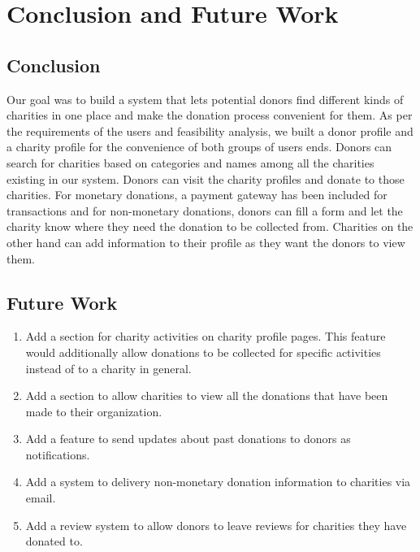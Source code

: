 \documentclass{scrreprt}
\begin{document}
\chapter{Conclusion and Future Work}

    \section{Conclusion}
    
        Our goal was to build a system that lets potential donors find different kinds of charities in one place and make the donation process convenient for them. As per the requirements of the users
        and feasibility analysis, we built a donor profile and a charity profile for the convenience of both groups of users ends. Donors can search for charities based on categories and names among all the charities existing in our system. Donors can visit the charity  profiles and donate to those charities. For monetary donations, a payment gateway has been included for transactions and for non-monetary donations, donors can fill a form and let the charity know where they need the donation to be collected from. Charities on the other hand can add information to their profile as they want the donors to view them.

    \section{Future Work}
        \begin{enumerate}
            \item Add a section for charity activities on charity profile pages. This feature would additionally allow donations to be collected for specific activities instead of to a charity in general.
            \item Add a section to allow charities to view all the donations that have been made to their organization.
            \item Add a feature to send updates about past donations to donors as notifications.
            \item Add a system to delivery non-monetary donation information to charities via email.
            \item Add a review system to allow donors to leave reviews for charities they have donated to.
        \end{enumerate}
\end{document}
